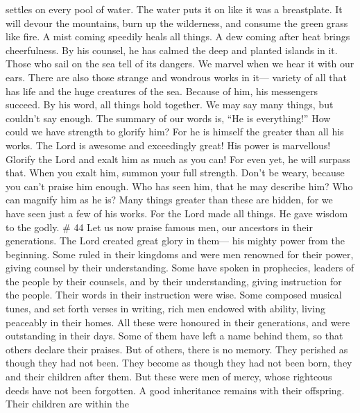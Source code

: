 settles on every pool of water. The water puts it on like it was a
breastplate.  It will devour the mountains, burn up the
wilderness, and consume the green grass like fire.  A mist
coming speedily heals all things. A dew coming after heat brings
cheerfulness.  By his counsel, he has calmed the deep and
planted islands in it.  Those who sail on the sea tell of
its dangers. We marvel when we hear it with our ears. 
There are also those strange and wondrous works in it--- variety of all
that has life and the huge creatures of the sea.  Because
of him, his messengers succeed. By his word, all things hold together.
 We may say many things, but couldn't say enough. The
summary of our words is, ``He is everything!''  How could
we have strength to glorify him? For he is himself the greater than all
his works.  The Lord is awesome and exceedingly great! His
power is marvellous!  Glorify the Lord and exalt him as
much as you can! For even yet, he will surpass that. When you exalt him,
summon your full strength. Don't be weary, because you can't praise him
enough.  Who has seen him, that he may describe him? Who
can magnify him as he is?  Many things greater than these
are hidden, for we have seen just a few of his works.  For
the Lord made all things. He gave wisdom to the godly. \# 44
 Let us now praise famous men, our ancestors in their
generations.  The Lord created great glory in them--- his
mighty power from the beginning.  Some ruled in their
kingdoms and were men renowned for their power, giving counsel by their
understanding. Some have spoken in prophecies,  leaders of
the people by their counsels, and by their understanding, giving
instruction for the people. Their words in their instruction were wise.
 Some composed musical tunes, and set forth verses in
writing,  rich men endowed with ability, living peaceably in
their homes.  All these were honoured in their generations,
and were outstanding in their days.  Some of them have left
a name behind them, so that others declare their praises. 
But of others, there is no memory. They perished as though they had not
been. They become as though they had not been born, they and their
children after them.  But these were men of mercy, whose
righteous deeds have not been forgotten.  A good
inheritance remains with their offspring. Their children are within the
